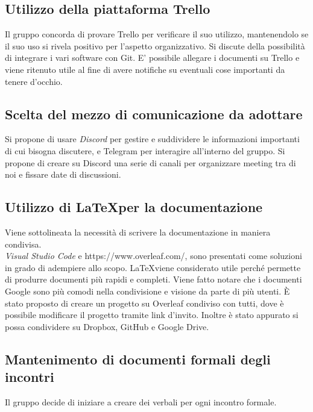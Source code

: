 \documentclass{article}
\begin{document}
\subsection{Utilizzo della piattaforma Trello}%
\label{sub:piattaforma_trello}
Il gruppo concorda di provare Trello per verificare il suo utilizzo, mantenendolo se il suo uso si rivela positivo per l’aspetto organizzativo. Si discute della possibilità di integrare i vari software con Git. E’ possibile allegare i documenti su Trello e viene ritenuto utile al fine di avere notifiche su eventuali cose importanti da tenere d’occhio.


\subsection{Scelta del mezzo di comunicazione da adottare}%
\label{sub:mezzo_comunicazione}
Si propone di usare \emph{Discord} per gestire e suddividere le informazioni importanti di cui bisogna discutere, e Telegram per interagire all’interno del gruppo. Si propone di creare su Discord una serie di canali per organizzare meeting tra di noi e fissare date di discussioni.

\subsection{Utilizzo di \LaTeX per la documentazione}%
\label{sub:latex}
Viene sottolineata la necessità di scrivere la documentazione in maniera condivisa. \\
\emph{Visual Studio Code} e https://www.overleaf.com/, sono presentati come soluzioni in grado di adempiere allo scopo. \LaTeX viene considerato utile perché permette di produrre documenti più rapidi e completi. Viene fatto notare che i documenti Google sono più comodi nella condivisione e visione da parte di più utenti. È stato proposto di creare un progetto su Overleaf condiviso con tutti, dove è possibile modificare il progetto tramite link d’invito. Inoltre è stato appurato si possa condividere su Dropbox, GitHub e Google Drive.


\subsection{Mantenimento di documenti formali degli incontri}%
\label{sub:documenti_formali}%
Il gruppo decide di iniziare a creare dei verbali per ogni incontro formale.
\end{document}
